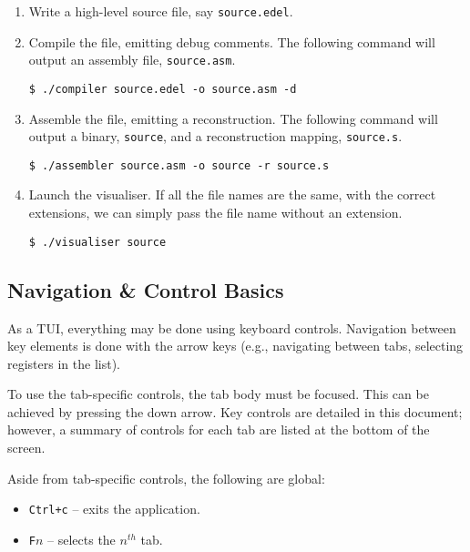 \documentclass[10pt]{article}
\begin{document}
    \begin{enumerate}
        \item Write a high-level source file, say \texttt{source.edel}.
        \item Compile the file, emitting debug comments.
        The following command will output an assembly file, \texttt{source.asm}.
        \begin{lstlisting}[style=bashconsole]
$ ./compiler source.edel -o source.asm -d
        \end{lstlisting}
        \item Assemble the file, emitting a reconstruction.
        The following command will output a binary, \texttt{source}, and a reconstruction mapping, \texttt{source.s}.
        \medskip
        \begin{lstlisting}[style=bashconsole]
$ ./assembler source.asm -o source -r source.s
        \end{lstlisting}
        \item Launch the visualiser.
        If all the file names are the same, with the correct extensions, we can simply pass the file name without an extension.
        \medskip
        \begin{lstlisting}[style=bashconsole]
$ ./visualiser source
        \end{lstlisting}
    \end{enumerate}

    \subsection{Navigation \& Control Basics}

    As a TUI, everything may be done using keyboard controls.
    Navigation between key elements is done with the arrow keys (e.g., navigating between tabs, selecting registers in the list).

    To use the tab-specific controls, the tab body must be focused.
    This can be achieved by pressing the down arrow.
    Key controls are detailed in this document; however, a summary of controls for each tab are listed at the bottom of the screen.

    Aside from tab-specific controls, the following are global:
    \begin{itemize}
        \item \texttt{Ctrl+c} -- exits the application.
        \item \texttt{F\(n\)} -- selects the \(n^{th}\) tab.
    \end{itemize}
\end{document}
